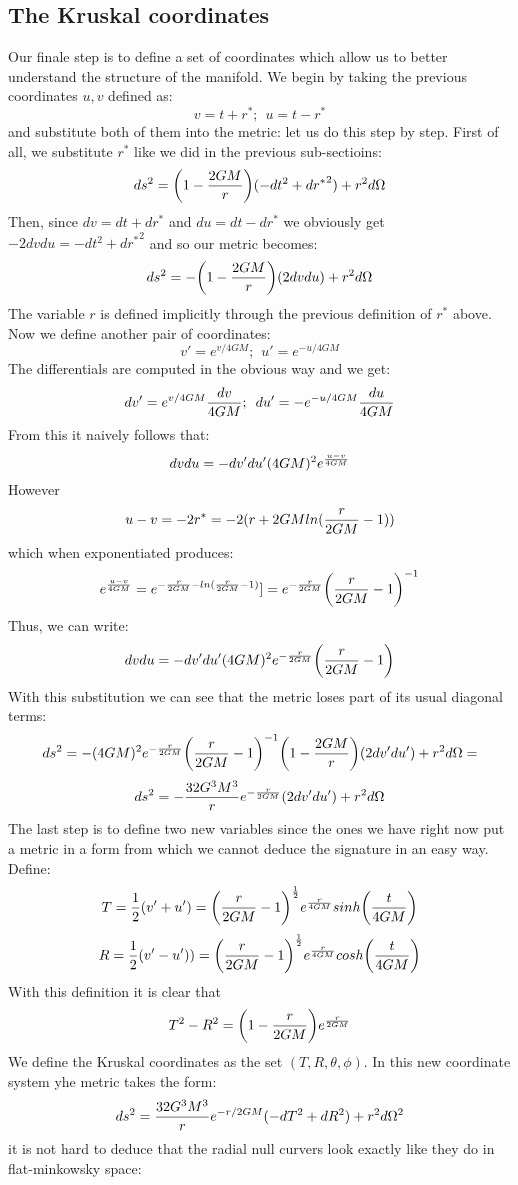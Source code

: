 \documentclass[]{article}
\theoremstyle{definition}
\theoremstyle{Theorem}
\theoremstyle{definition}
\theoremstyle{definition}
\theoremstyle{definition}
\begin{document}
\subsection{The Kruskal coordinates }
Our finale step is to define a set of coordinates which allow us to better understand the structure of the manifold. We begin by taking the previous coordinates $u,v$ defined as:
$$v=t+r^*;\hspace{5pt} u=t-r^*$$ and substitute both of them into the metric: let us do this step by step. First of all, we substitute $r^*$ like we did in the previous sub-sectioins:
$$ds^2=\bigg(1-{2GM\over r}\bigg)(-dt^2+{dr^*}^2)+r^2d\Omega$$
Then, since $dv=dt+dr^*$ and $du=dt-dr^*$ we obviously get $-2dvdu=-dt^2+d{r^*}^2$ and so our metric becomes:
$$ds^2=-\bigg(1-{2GM\over r}\bigg)(2dvdu)+r^2d\Omega$$
The variable $r$ is defined implicitly through the previous definition of $r^*$ above. Now we define another pair of coordinates:
$$v'=e^{v/4GM};\hspace{5pt} u'=e^{-u/4GM}$$
The differentials are computed in the obvious way and we get: $$dv'=e^{v/4GM}{dv\over 4GM};\hspace{5pt} du'=-e^{-u/4GM}{du\over 4GM}$$
From this it naively follows that:
$$dvdu=-dv'du'(4GM)^2e^{u-v\over 4GM}$$
However $$u-v=-2r^*=-2(r+2GMln({r\over 2GM}-1))$$
which when exponentiated produces:
$$e^{u-v\over 4GM}=e^{-{r\over 2GM}-ln({r\over 2GM}-1)}]=e^{-{r\over 2GM}}\bigg({r\over 2GM}-1\bigg)^{-1}$$
Thus, we can write:
$$dvdu=-dv'du'(4GM)^2e^{-{r\over 2GM}}\bigg({r\over 2GM}-1\bigg)$$
With this substitution we can see that the metric loses part of its usual diagonal terms:
$$ds^2=-(4GM)^2e^{-{r\over 2GM}}\bigg({r\over 2GM}-1\bigg)^{-1}\bigg(1-{2GM\over r}\bigg)(2dv'du')+r^2d\Omega=$$
$$ds^2=-{32G^3M^3\over r}e^{-{r\over 2GM}}(2dv'du')+r^2d\Omega$$
The last step is to define two new variables since the ones we have right now put a metric in a form from which we cannot deduce the signature in an easy way.
Define:
$$T={1\over 2}(v'+u')=\bigg({r\over 2GM}-1\bigg)^{1\over 2}e^{r\over 4GM}sinh\bigg({t\over 4GM}\bigg)$$ 
$$R={1\over 2}(v'-u'))=\bigg({r\over 2GM}-1\bigg)^{1\over 2}e^{r\over 4GM}cosh\bigg({t\over 4GM}\bigg)$$
With this definition it is clear that
$$T^2-R^2=\bigg(1-{r\over 2GM}\bigg)e^{r\over 2GM}$$
We define the Kruskal coordinates as the set $(T,R,\theta, \phi)$. In this new coordinate system yhe metric takes the form:
$$ds^2={32G^3M^3\over r}e^{-r/2GM}(-dT^2+dR^2)+r^2d\Omega^2$$ 
it is not hard to deduce that the radial null curvers look exactly like they do in flat-minkowsky space:
\end{document}

